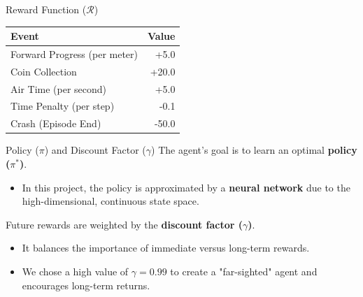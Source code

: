 \documentclass[serif]{beamer}  %
\begin{document}
    \begin{frame}{Reward Function ($\mathcal{R}$)}
        \centering
        \renewcommand{\arraystretch}{1.5}
        \begin{tabular}{l r}
            \toprule
            \textbf{Event} & \textbf{Value} \\
            \midrule
            Forward Progress (per meter) & +5.0 \\
            Coin Collection & +20.0 \\
            Air Time (per second) & +5.0 \\
            Time Penalty (per step) & -0.1 \\
            Crash (Episode End) & -50.0 \\
            \bottomrule
        \end{tabular}
    \end{frame}

    \begin{frame}{Policy ($\pi$) and Discount Factor ($\gamma$)}
     The agent's goal is to learn an optimal \textbf{policy ($\pi^*$)}.
    
    \begin{itemize}
        \item In this project, the policy is approximated by a \textbf{neural network} due to the high-dimensional, continuous state space.
    \end{itemize}
        
    Future rewards are weighted by the \textbf{discount factor ($\gamma$)}.
    
    \begin{itemize}
        \item It balances the importance of immediate versus long-term rewards.
        \item We chose a high value of \textbf{$\gamma = 0.99$} to create a "far-sighted" agent and encourages long-term returns.
    \end{itemize}
        
    \end{frame}
\end{document}
